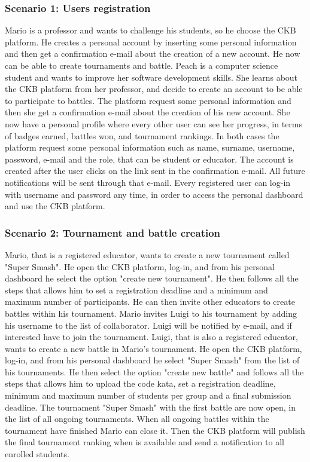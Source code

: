 \subsubsection{Scenario 1: Users registration}
Mario is a professor and wants to challenge his students, so he choose the CKB platform. He creates a personal account by inserting some personal information and then get a confirmation e-mail about the creation of a new account. He now can be able to create tournaments and battle. \newline
Peach is a computer science student and wants to improve her software development skills. She learns about the CKB platform from her professor, and decide to create an account to be able to participate to battles. The platform request some personal information and then she get a confirmation e-mail about the creation of his new account. She now have a personal profile where every other user can see her progress, in terms of badges earned, battles won, and tournament rankings. \newline
In both cases the platform request some personal information such as name, surname, username, password, e-mail and the role, that can be student or educator. The account is created after the user clicks on the link sent in the confirmation e-mail. All future notifications will be sent through that e-mail. \newline
Every registered user can log-in with username and password any time, in order to access the personal dashboard and use the CKB platform.

\subsubsection{Scenario 2: Tournament and battle creation}
Mario, that is a registered educator, wants to create a new tournament called "Super Smash". He open the CKB platform, log-in, and from his personal dashboard he select the option "create new tournament". He then follows all the steps that allows him to set a registration deadline and a minimum and maximum number of participants. He can then invite other educators to create battles within his tournament. \newline
Mario invites Luigi to his tournament by adding his username to the list of collaborator. Luigi will be notified by e-mail, and if interested have to join the tournament. \newline
Luigi, that is also a registered educator, wants to create a new battle in Mario's tournament. He open the CKB platform, log-in, and from his personal dashboard he select "Super Smash" from the list of his tournaments.
He then select the option "create new battle" and follows all the steps that allows him to upload the code kata, set a registration deadline, minimum and maximum number of students per group and a final submission deadline.
The tournament "Super Smash" with the first battle are now open, in the list of all ongoing tournaments. \newline
When all ongoing battles within the tournament have finished Mario can close it. Then the CKB platform will publish the final tournament ranking when is available and send a notification to all enrolled students.

